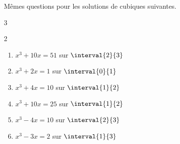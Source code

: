 \documentclass[main.tex]{subfiles}
\begin{document}
\begin{exercise} Mêmes questions pour les solutions de cubiques suivantes.
\begin{multicols}{3}
	\begin{spacing}{2}
	\begin{enumerate}[leftmargin=*,label=\arabic*)]
		\item $x^3+10x=51$ sur $\interval{2}{3}$
		\item $x^3+2x=1$ sur $\interval{0}{1}$
		\item $x^3+4x=10$ sur $\interval{1}{2}$
		\item $x^3+10x=25$ sur $\interval{1}{2}$
		\item[\textbullet] $x^3-4x=10$ sur $\interval{2}{3}$
		\item[\textbullet] $x^3-3x=2$ sur $\interval{1}{3}$
	\end{enumerate} 
	\end{spacing}
\end{multicols}
\end{exercise}
\end{document}
